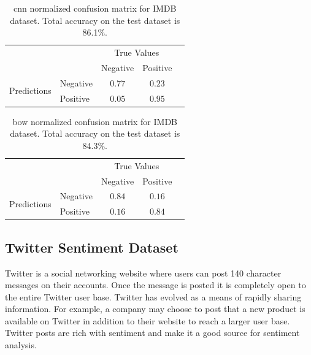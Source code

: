 \documentclass[12pt]{article}
\begin{document}
\begin{table}[!htbp]
	\centering
	\begin{tabular}{l|l|c|c|c}
		\multicolumn{2}{c}{}&\multicolumn{2}{c}{True Values}&\\
		\cline{3-4}
		\multicolumn{2}{c|}{}&Negative&Positive&\multicolumn{1}{c}{}\\
		\cline{2-4}
		\multirow{2}{*}{Predictions}& Negative & $0.77$ & $0.23$ & \\
		\cline{2-4}
		& Positive & $0.05$ & $0.95$ &\\
		\cline{2-4}
		
	\end{tabular}
	\caption{\ac{cnn} normalized confusion matrix for IMDB dataset. Total accuracy on the test dataset is 86.1\%.}
	\label{table:c_imdb}
\end{table}


%
%

\begin{table}[!htbp]
	\centering
	\begin{tabular}{l|l|c|c|c}
		\multicolumn{2}{c}{}&\multicolumn{2}{c}{True Values}&\\
		\cline{3-4}
		\multicolumn{2}{c|}{}&Negative&Positive&\multicolumn{1}{c}{}\\
		\cline{2-4}
		\multirow{2}{*}{Predictions}& Negative & $0.84$ & $0.16$ & \\
		\cline{2-4}
		& Positive & $0.16$ & $0.84$ &\\
		\cline{2-4}
		
	\end{tabular}
	\caption{\ac{bow} normalized confusion matrix for IMDB dataset. Total accuracy on the test dataset is 84.3\%.}
	\label{table:b_imdb}
\end{table}



\subsection{Twitter Sentiment Dataset}

Twitter is a social networking website \cite{twitter} where users can post 140 character messages on their accounts. Once the message is posted it is completely open to the entire Twitter user base. Twitter has evolved as a means of rapidly sharing information. For example, a company may choose to post that a new product is available on Twitter in addition to their website to reach a larger user base. Twitter posts are rich with sentiment and make it a good source for sentiment analysis.
\end{document}
